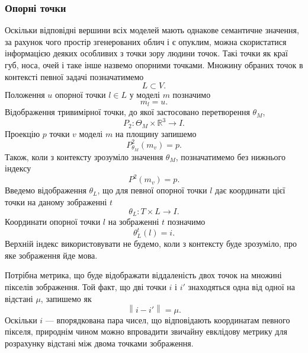 \subsubsection{Опорні точки}

Оскільки відповідні вершини всіх моделей мають однакове семантичне значення,
за рахунок чого простір згенерованих облич і є опуклим,
можна скористатися інформацією деяких особливих з точки зору людини точок.
Такі точки як краї губ, носа, очей і таке інше назвемо опорними точками.
Множину обраних точок в контексті певної задачі позначатимемо
\begin{equation*}
  L \subset V.
\end{equation*}
Положення $u$ опорної точки $l \in L$ у моделі $m$ позначимо
\begin{equation*}
  m_{l} = u.
\end{equation*}
Відображення тривимірної точки,
до якої застосовано перетворення $\theta_M$,
\begin{equation*}
  P_2: \Theta_M \times \mathbb{R}^3 \rightarrow I.
\end{equation*}
Проекцію $p$ точки $v$ моделі $m$ на площину запишемо
\begin{equation*}
  P^2_{\theta_M}\left( m_v \right) = p.
\end{equation*}
Також, коли з контексту зрозуміло значення $\theta_M$,
позначатимемо без нижнього індексу
\begin{equation*}
  P^2\left( m_v \right) = p.
\end{equation*}
Введемо відображення $\theta_L$,
що для певної опорної точки $l$
дає координати цієї точки на даному зображенні $t$
\begin{equation*}
  \theta_L: T \times L \rightarrow I.
\end{equation*}
Координати опорної точки $l$ на зображенні $t$ позначимо
\begin{equation*}
  \theta_L^t\left( l \right) = i.
\end{equation*}
Верхній індекс використовувати не будемо, коли з контексту буде зрозуміло,
про яке зображення йде мова.

Потрібна метрика,
що буде відображати віддаленість двох точок на множині пікселів зображення.
Той факт,
що дві точки $i$ і $i'$ знаходяться одна від одної на відстані $\mu$,
запишемо як
\begin{equation*}
  \left\| i - i' \right\| = \mu.
\end{equation*}
Оскільки $i$ --- впорядкована пара чисел,
що відповідають координатам певного пікселя,
природнім чином можно впровадити звичайну евклідову метрику
для розрахунку відстані між двома точками зображення.

